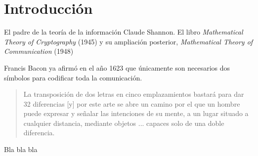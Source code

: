 \chapter*{Introducción}

El padre de la teoría de la información Claude Shannon. El libro \textit{Mathematical Theory of Cryptography} (1945) y su ampliación posterior, \textit{Mathematical Theory of Communication} (1948)

Francis Bacon ya afirmó en el año 1623 que únicamente son necesarios dos símbolos para codificar toda la comunicación.

\blockquote[{\cite[30]{dyson_catedral_2015}}]{La transposición de dos letras en cinco emplazamientos bastará para dar 32 diferencias [y] por este arte se abre un camino por el que un hombre puede expresar y señalar las intenciones de su mente, a un lugar situado a cualquier distancia, mediante objetos ... capaces solo de una doble diferencia.}

Bla bla bla